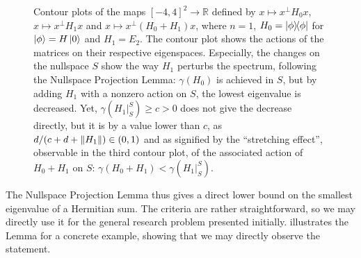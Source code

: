 \documentclass[10pt]{amsart}
\theoremstyle{definition}
\theoremstyle{remark}
\begin{document}
\begin{figure}[!hbtp]
        \caption{Contour plots of the maps \([-4, 4]^2 \to \mathbb{R}\) defined by \(x \mapsto x^\perp H_0x\), \(x \mapsto x^\perp H_1x\) and \(x \mapsto x^\perp (H_0+H_1)x\), where \(n = 1\), \(H_0 = \ketbra{\phi}{\phi}\) for \(\ket{\phi} = H\ket{0}\) and \(H_1 = E_2\). The contour plot shows the actions of the matrices on their respective eigenspaces. Especially, the changes on the nullspace \(S\) show the way \(H_1\) perturbs the spectrum, following the Nullspace Projection Lemma: \(\gamma(H_0)\) is achieved in \(S\), but by adding \(H_1\) with a nonzero action on \(S\), the lowest eigenvalue is decreased. Yet, \(\gamma(H_1|_S^S) \geq c > 0\) does not give the decrease directly, but it is by a value lower than \(c\), as \(d/(c+d+\norm{H_1}) \in (0, 1)\) and as signified by the \enquote{stretching effect}, observable in the third contour plot, of the associated action of \(H_0+H_1\) on \(S\): \(\gamma(H_0+H_1) < \gamma(H_1|_S^S)\).}
        \label{fig:nullspace_projection_lemma_example_contour_plots}
    \end{figure}

    The Nullspace Projection Lemma thus gives a direct lower bound on the smallest eigenvalue of a Hermitian sum. The criteria are rather straightforward, so we may directly use it for the general research problem presented initially.  illustrates the Lemma for a concrete example, showing that we may directly observe the statement.
\end{document}
